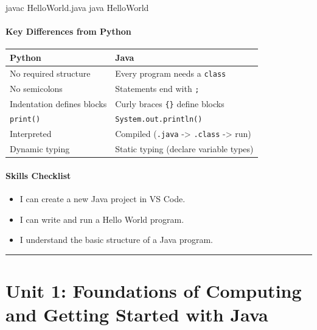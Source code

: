 \documentclass[
  justified,
  openright,
]{tufte-book}
\let\subsubsection\paragraph
\let\paragraph\paragraph
\newcommand{\ExtensionTok}[1]{#1}
\newcommand{\NormalTok}[1]{#1}
\newenvironment{Shaded}{%
  \begin{snugshade}
}{%
  \end{snugshade}
}
\let\subsubsection\paragraph
\let\paragraph\paragraph
\providecommand{\tightlist}{%
  \setlength{\itemsep}{0pt}\setlength{\parskip}{0pt}}
\begin{document}
\begin{Shaded}
\begin{Highlighting}[]
\ExtensionTok{javac}\NormalTok{ HelloWorld.java}
\ExtensionTok{java}\NormalTok{ HelloWorld}
\end{Highlighting}
\end{Shaded}

\subsubsection{Key Differences from
Python}\label{key-differences-from-python}

{\def\LTcaptype{none} %
\begin{longtable}[]{@{}ll@{}}
\toprule\noalign{}
Python & Java \\
\midrule\noalign{}
\endhead
\bottomrule\noalign{}
\endlastfoot
No required structure & Every program needs a \texttt{class} \\
No semicolons & Statements end with \texttt{;} \\
Indentation defines blocks & Curly braces \texttt{\{\}} define blocks \\
\texttt{print()} & \texttt{System.out.println()} \\
Interpreted & Compiled (\texttt{.java} -\textgreater{} \texttt{.class}
-\textgreater{} run) \\
Dynamic typing & Static typing (declare variable types) \\
\end{longtable}
}

\subsubsection{Skills Checklist}\label{skills-checklist-2}

\begin{itemize}
\tightlist
\item[$\square$]
  I can create a new Java project in VS Code.
\item[$\square$]
  I can write and run a Hello World program.
\item[$\square$]
  I understand the basic structure of a Java program.
\end{itemize}

\begin{center}\rule{0.5\linewidth}{0.5pt}\end{center}

\section{Unit 1: Foundations of Computing and Getting Started with
Java}\label{unit-1-foundations-of-computing-and-getting-started-with-java}
\end{document}
